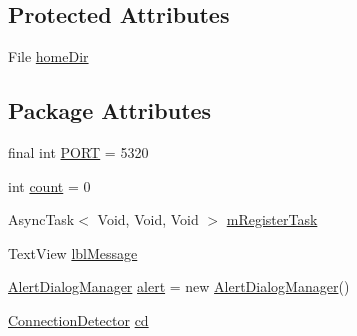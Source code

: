 \subsection*{\-Protected \-Attributes}
\begin{DoxyCompactItemize}
\item 
\-File \hyperlink{classcom_1_1axcoto_1_1shinjuku_1_1sushi_1_1_main_activity_a72e0ddd6bd8114f13338753972e2a34a}{home\-Dir}
\end{DoxyCompactItemize}
\subsection*{\-Package \-Attributes}
\begin{DoxyCompactItemize}
\item 
final int \hyperlink{classcom_1_1axcoto_1_1shinjuku_1_1sushi_1_1_main_activity_aa890d9fd10dbc9c090551a04b009e286}{\-P\-O\-R\-T} = 5320
\item 
int \hyperlink{classcom_1_1axcoto_1_1shinjuku_1_1sushi_1_1_main_activity_ad43c3812e6d13e0518d9f8b8f463ffcf}{count} = 0
\item 
\-Async\-Task$<$ \-Void, \-Void, \-Void $>$ \hyperlink{classcom_1_1axcoto_1_1shinjuku_1_1sushi_1_1_main_activity_a317bd65984f83feb7cfb0b5a7939d979}{m\-Register\-Task}
\item 
\-Text\-View \hyperlink{classcom_1_1axcoto_1_1shinjuku_1_1sushi_1_1_main_activity_a376baa9689bfdf117678979a41aca661}{lbl\-Message}
\item 
\hyperlink{classcom_1_1axcoto_1_1shinjuku_1_1sushi_1_1_alert_dialog_manager}{\-Alert\-Dialog\-Manager} \hyperlink{classcom_1_1axcoto_1_1shinjuku_1_1sushi_1_1_main_activity_afc78c9c069c522d80dd05ed359c0cd33}{alert} = new \hyperlink{classcom_1_1axcoto_1_1shinjuku_1_1sushi_1_1_alert_dialog_manager}{\-Alert\-Dialog\-Manager}()
\item 
\hyperlink{classcom_1_1axcoto_1_1shinjuku_1_1sushi_1_1_connection_detector}{\-Connection\-Detector} \hyperlink{classcom_1_1axcoto_1_1shinjuku_1_1sushi_1_1_main_activity_ac830deac2b91f4288ef640d97bdb58d3}{cd}
\end{DoxyCompactItemize}
